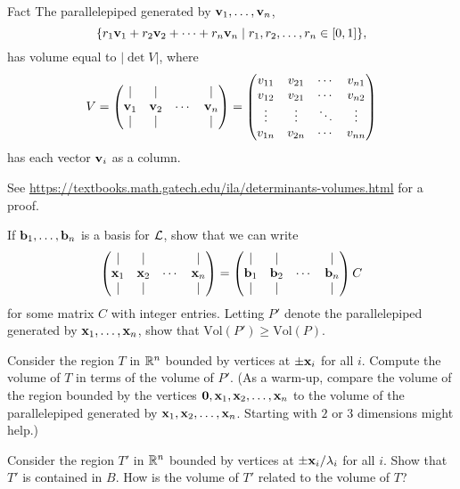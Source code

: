 \begin{toprove}{Fact}\label{fact:detvol}
	The parallelepiped generated by $\mathbf{v}_1,\ldots,\mathbf{v}_n$,
	\[\{r_1\mathbf{v}_1+r_2\mathbf{v}_2+\cdots+r_n\mathbf{v}_n\mid r_1,r_2,\ldots,r_n\in [0,1]\},\]
	has volume equal to $|\det V|$, where
	\[V=\begin{pmatrix}
	\mid & \mid & & \mid\\
	\mathbf{v}_1 & \mathbf{v}_2 & \cdots & \mathbf{v}_n\\
	\mid & \mid & & \mid	
	\end{pmatrix}=\begin{pmatrix}
	v_{11} & v_{21} & \cdots & v_{n1}\\
	v_{12} & v_{21} & \cdots & v_{n2}\\
	\vdots & \vdots & \ddots & \vdots\\
	v_{1n} & v_{2n} & \cdots & v_{nn}
	\end{pmatrix}\]
	has each vector $\mathbf{v}_i$ as a column.
\end{toprove}
\noindent
See \url{https://textbooks.math.gatech.edu/ila/determinants-volumes.html} for a proof.

\begin{explor}
	If $\mathbf{b}_1,\ldots,\mathbf{b}_n$ is a basis for $\mathcal{L}$, show that we can write 
	\[\begin{pmatrix}
	\mid & \mid & & \mid\\
	\mathbf{x}_1 & \mathbf{x}_2 & \cdots & \mathbf{x}_n\\
	\mid & \mid & & \mid	
	\end{pmatrix}=\begin{pmatrix}
	\mid & \mid & & \mid\\
	\mathbf{b}_1 & \mathbf{b}_2 & \cdots & \mathbf{b}_n\\
	\mid & \mid & & \mid	
	\end{pmatrix}C\]
	for some matrix $C$ with integer entries. Letting $P'$ denote the parallelepiped generated by $\mathbf{x}_1,\ldots,\mathbf{x}_n$, show that $\text{Vol}(P')\geq \text{Vol}(P)$. 
\end{explor}

\begin{explor}
	Consider the region $T$ in $\mathbb{R}^n$ bounded by vertices at $\pm \mathbf{x}_i$ for all $i$. Compute the volume of $T$ in terms of the volume of $P'$. \color{DarkGreen}(As a warm-up, compare the volume of the region bounded by the vertices $\mathbf{0},\mathbf{x}_1,\mathbf{x}_2,\ldots,\mathbf{x}_n$ to the volume of the parallelepiped generated by $\mathbf{x}_1,\mathbf{x}_2,\ldots,\mathbf{x}_n$. Starting with $2$ or $3$ dimensions might help.)
\end{explor}

\begin{explor}
	Consider the region $T'$ in $\mathbb{R}^n$ bounded by vertices at $\pm \mathbf{x}_i/\lambda_i$ for all $i$. Show that $T'$ is contained in $B$. How is the volume of $T'$ related to the volume of $T$?
\end{explor}